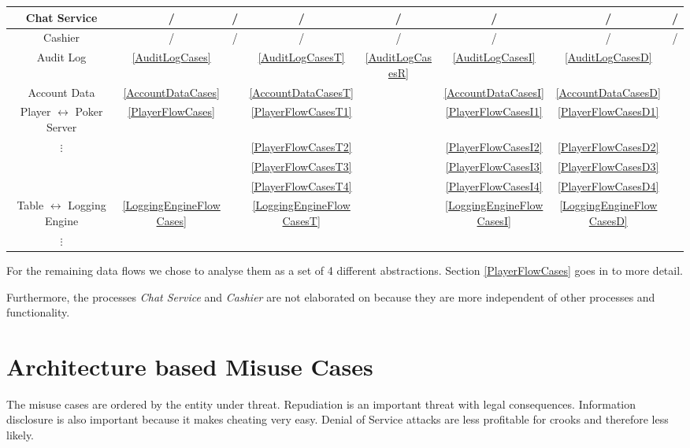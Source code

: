 \documentclass[a4paper,11pt]{report}
\begin{document}
\begin{center}
\begin{tabular}{| c || c || c | c | c | c | c | c |}
  Chat Service 		& /			& / 	& /	& / 	& / 	& / 	& /	\\\hline
  Cashier 		& /			& / 	& /	& / 	& / 	& / 	& /	\\\hline
  \hline
  Audit Log 		& \ref{AuditLogCases}		& 	& \ref{AuditLogCasesT}	& \ref{AuditLogCasesR} 	& \ref{AuditLogCasesI} 	& \ref{AuditLogCasesD}	& 	\\\hline
  Account Data 		& \ref{AccountDataCases}	& 	& \ref{AccountDataCasesT}	&  	& \ref{AccountDataCasesI} 	& \ref{AccountDataCasesD}	& 	\\\hline
  \hline
  Player $\leftrightarrow$
  Poker Server 		& \ref{PlayerFlowCases}		&	& \ref{PlayerFlowCasesT1}	&	& \ref{PlayerFlowCasesI1}	& \ref{PlayerFlowCasesD1}	&\\
  $\vdots$		& 				&	& \ref{PlayerFlowCasesT2}	&	& \ref{PlayerFlowCasesI2}	& \ref{PlayerFlowCasesD2}	&	\\
  			&				&	& \ref{PlayerFlowCasesT3}	&	& \ref{PlayerFlowCasesI3}	& \ref{PlayerFlowCasesD3}	\\
  			&				&	& \ref{PlayerFlowCasesT4}	&	& \ref{PlayerFlowCasesI4}	& \ref{PlayerFlowCasesD4}	\\\hline
  Table $\leftrightarrow$
  Logging Engine 	& \ref{LoggingEngineFlowCases}	&	& \ref{LoggingEngineFlowCasesT}	&	& \ref{LoggingEngineFlowCasesI}	& \ref{LoggingEngineFlowCasesD}	&	\\
  $\vdots$		& 				&	& 	&	& 	& 	&	\\\hline
\end{tabular}\end{center}
\vspace{0.3cm}

For the remaining data flows we chose to analyse them as a set of 4 different abstractions. Section \ref{PlayerFlowCases} goes in to more detail.

Furthermore, the processes \textit{Chat Service} and \textit{Cashier} are not elaborated on because they are more independent of other processes and functionality.

\section{Architecture based Misuse Cases}
\label{MisUseCases}

The misuse cases are ordered by the entity under threat. Repudiation is an important threat with legal consequences. Information disclosure is also important because it makes cheating very easy. Denial of Service attacks are less profitable for crooks and therefore less likely.
\end{document}
